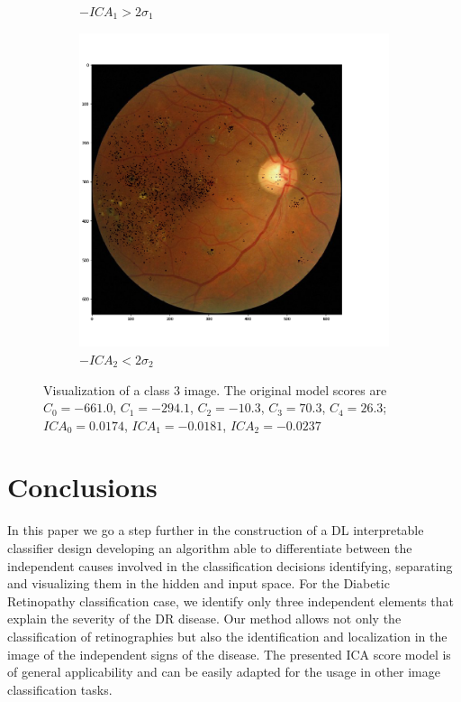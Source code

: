 \documentclass{llncs}
\begin{document}
\begin{figure}[h!]
\begin{subfigure}[b]{0.32\textwidth}
		\caption{$-ICA_1 > 2 \sigma_1$}
	\end{subfigure}
	\hfill 
	\begin{subfigure}[b]{0.32\textwidth}
		\centering
		\includegraphics[width=\textwidth]{./figures/c3/retina_mICA2.png}
		\caption{$-ICA_2 < 2 \sigma_2$}
	\end{subfigure}
	\caption{Visualization of a class 3 image. The original model scores are $C_0 = -661.0$, $C_1 = -294.1$,  $C_2 = -10.3$,   $C_3 = 70.3$,   $C_4 = 26.3$; $ICA_0 = 0.0174$, $ICA_1 = -0.0181$, $ICA_2 = -0.0237$}  
	\label{fig:ica_components_c3} 
\end{figure}

\section{Conclusions}\label{sec:conclusions}

In this paper we go a step further in the construction of a DL interpretable classifier design developing an algorithm able to differentiate between the independent causes involved in the classification decisions identifying, separating and visualizing them in the hidden and input space. For the Diabetic Retinopathy classification case, we identify only three independent elements that explain the severity of the DR disease. Our method allows not only the classification of retinographies but also the identification and localization in the image of the independent signs of the disease. The presented ICA score model is of general applicability and can be easily adapted for the usage in other image classification tasks.
\end{document}
